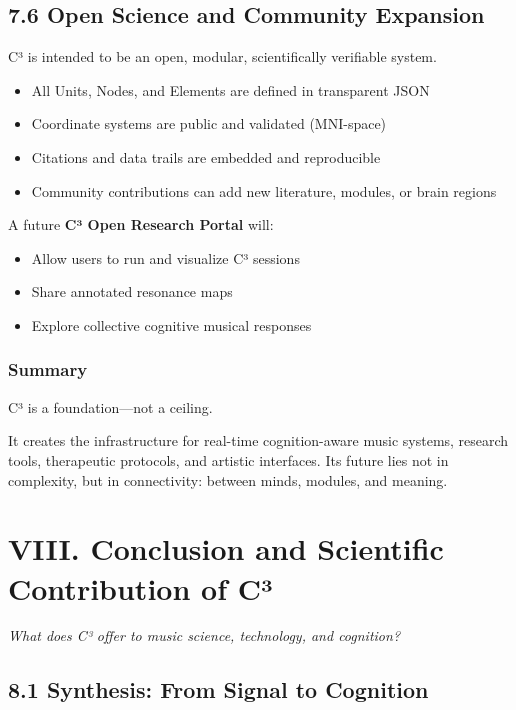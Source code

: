\documentclass[10pt]{article}
\begin{document}
\subsection*{7.6 Open Science and Community Expansion}

C³ is intended to be an open, modular, scientifically verifiable system.

\begin{itemize}
    \item All Units, Nodes, and Elements are defined in transparent JSON
    \item Coordinate systems are public and validated (MNI-space)
    \item Citations and data trails are embedded and reproducible
    \item Community contributions can add new literature, modules, or brain regions
\end{itemize}

A future \textbf{C³ Open Research Portal} will:

\begin{itemize}
    \item Allow users to run and visualize C³ sessions
    \item Share annotated resonance maps
    \item Explore collective cognitive musical responses
\end{itemize}

\subsubsection*{Summary}

C³ is a foundation—not a ceiling.

It creates the infrastructure for real-time cognition-aware music systems, research tools, therapeutic protocols, and artistic interfaces. Its future lies not in complexity, but in connectivity: between minds, modules, and meaning.

\section*{VIII. Conclusion and Scientific Contribution of C³}

\textit{What does C³ offer to music science, technology, and cognition?}

\subsection*{8.1 Synthesis: From Signal to Cognition}
\end{document}
